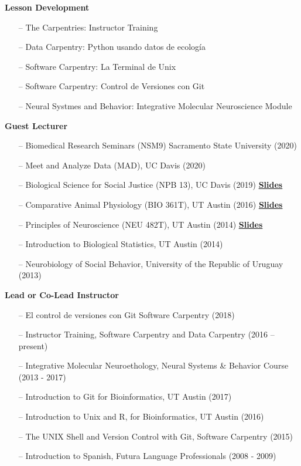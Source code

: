 \documentclass[margin,line]{CV}
\begin{document}
\begin{resume}
{\bf Lesson Development}
\begin{itemize}
\raggedright

\item[--] The Carpentries: Instructor Training
\item[--] Data Carpentry: Python usando datos de ecología %
\item[--] Software Carpentry: La Terminal de Unix  %
\item[--] Software Carpentry: Control de Versiones con Git   %
\item[--] Neural Systmes and Behavior: Integrative Molecular Neuroscience Module %

\end{itemize}


{\bf Guest Lecturer}
\begin{itemize}
\item[--] Biomedical Research Seminars (NSM9) Sacramento State University (2020)
\item[--] Meet and Analyze Data (MAD), UC Davis (2020)
\item[--] Biological Science for Social Justice (NPB 13), UC Davis (2019) \href{https://speakerdeck.com/raynamharris/biological-science-for-social-justice-democratizing-data-science}{\textbf{Slides}}
\item[--] Comparative Animal Physiology (BIO 361T), UT Austin (2016) \href{https://www.slideshare.net/raynamharris/evolution-of-social-brains}{\textbf{Slides}}
\item[--] Principles of Neuroscience (NEU 482T), UT Austin (2014) \href{https://www.slideshare.net/raynamharris/harris-rm-2014-sensory-integration-and-behavior}{\textbf{Slides}}
\item[--] Introduction to Biological Statistics, UT Austin (2014)
\item[--] Neurobiology of Social Behavior, University of the Republic of Uruguay (2013)
\end{itemize}

{\bf Lead or Co-Lead Instructor }
\begin{itemize}
\raggedright
\item[--] El control de versiones con Git Software Carpentry (2018)
\item[--] Instructor Training, Software Carpentry and Data Carpentry (2016 – present)
\item[--] Integrative Molecular Neuroethology, Neural Systems \& Behavior Course (2013 - 2017)
\item[--] Introduction to Git for Bioinformatics, UT Austin (2017)
\item[--] Introduction to Unix and R, for Bioinformatics, UT Austin (2016)
\item[--] The UNIX Shell and Version Control with Git, Software Carpentry (2015)
\item[--] Introduction to Spanish, Futura Language Professionals (2008 - 2009)
\end{itemize}


\end{resume}
\end{document}
